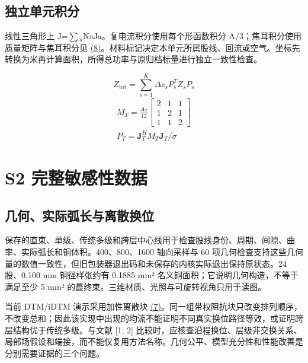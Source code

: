 \documentclass[11pt]{article}
\begin{document}
\subsection*{独立单元积分}
\hypertarget{S1.triangle_derivation.heading}{}
线性三角形上 J=\(\sum\)\(_a\)NaJa。复电流积分使用每个形函数积分 A/3；焦耳积分使用质量矩阵与焦耳积分见 \href{paper_zh-CN_single.pdf#E09}{(8)}。材料标记决定本单元所属股线、回流或空气。坐标先转换为米再计算面积，所得总功率与原归档标量进行独立一致性检查。


\hypertarget{E06}{}\begin{equation}Z_{\mathrm{tot}}=\sum_{s=1}^{K}\Delta z_s P_s^T Z_s P_s\tag{7}\label{eq:E06}\end{equation}
\hypertarget{E09}{}
\begin{equation}
\begin{gathered}
M_T=\frac{A_T}{12}\begin{bmatrix}2&1&1\\1&2&1\\1&1&2\end{bmatrix} \\
P_T=\mathbf J_T^H M_T\mathbf J_T/\sigma
\end{gathered}
\tag{8}\label{eq:E09}
\end{equation}
\FloatBarrier
\section*{S2 完整敏感性数据}
\hypertarget{chapter-S2}{}
\subsection*{几何、实际弧长与离散换位}
\hypertarget{S2.geometry.heading}{}
保存的直束、单级、传统多级和跨层中心线用于检查股线身份、周期、间隙、曲率、实际弧长和铜体积。400、800、1600 轴向采样与 60 项几何检查支持这些几何量的数值一致性，但旧包装器退出码和未保存的内核实际退出保持原状态。24 股、0.100 mm 铜径样张约有 0.1885 mm² 名义铜面积；它说明几何构造，不等于满足至少 5 mm² 的最终束。三维材质、光照与可旋转视角只用于读图。


当前 DTM/iDTM 演示采用加性离散块 \href{paper_zh-CN_single.pdf#E06}{(7)}。同一组带权阻抗块只改变排列顺序，不改变总和；因此该实现中出现的均流不能证明不同真实换位路径等效，或证明跨层结构优于传统多级。与文献 [1, 2] 比较时，应核查沿程换位、层级非交换关系、局部场假设和端接，而不能仅复用方法名称。几何公平、模型充分性和性能改善是分别需要证据的三个问题。
\end{document}
